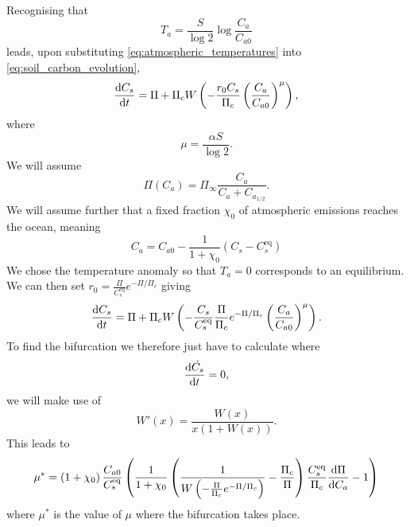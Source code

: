 Recognising that
\begin{equation}
  \label{eq:atmospheric_temperatures}
  T_a = \frac{S}{\log 2} \log \frac{C_a}{C_{a0}} 
\end{equation}
leads, upon substituting \cref{eq:atmospheric_temperatures} into \cref{eq:soil_carbon_evolution},
\begin{equation}
  \label{eq:global_soil_carbon}
  \dv{C_s}{t} = \Pi + \Pi_c W\left(-\frac{r_0C_s}{\Pi_c} \left(\frac{C_a}{C_{a0}}\right)^\mu \right),
\end{equation}
where
\begin{equation}
  \label{eq:mu}
  \mu = \frac{\alpha S}{\log 2}.
\end{equation}
We will assume
\begin{equation}
  \label{eq:npp_fertilization}
  \Pi(C_a) = \Pi_{\infty}\frac{C_a}{C_a + C_{a_{1/2}}}.
\end{equation}
We will assume further that a fixed fraction $\chi_0$ of atmospheric emissions reaches the ocean, meaning
\begin{equation}
  \label{eq:simple_ocean}
  C_a = C_{a0} -\frac{1}{1+\chi_0} (C_s - C_{s}^{\mathrm{eq}})
\end{equation}
We chose the temperature anomaly so that $T_a = 0$ corresponds to an equilibrium. We can then set
$r_0 = \frac{\Pi}{C_s^{\mathrm{eq}}}e^{-\Pi/\Pi_c}$ giving
\begin{equation}
  \label{eq:soil_carbon_evolution_with_r0_fixed}
  \dv{C_s}{t} = \Pi + \Pi_c W\left(-\frac{C_s}{C_s^{\mathrm{eq}}}\frac{\Pi}{\Pi_c}e^{-\Pi/\Pi_c} \left(\frac{C_a}{C_{a0}}\right)^\mu \right).
\end{equation}
To find the bifurcation we therefore just have to calculate where
\begin{equation*}
  \dv{\dot{C_s}}{t} = 0,
\end{equation*}
we will make use of
\begin{equation}
  \label{eq:derivative_of_lambert_W}
  W'(x) = \frac{W(x)}{x\left(1 + W\left(x\right)\right)}.
\end{equation}
This leads to
\begin{equation}
  \label{eq:critical_mu}
  \mu^* = \left(1 + \chi_0\right) \frac{C_{a0}}{C_s^{\mathrm{eq}}} \left( \frac{1}{1+\chi_0}\left( \frac{1}{W\left(-\frac{\Pi}{\Pi_c}e^{-\Pi/\Pi_c}\right)}
      - \frac{\Pi_c}{\Pi}\right)\frac{C_s^{\mathrm{eq}}}{\Pi_c}\dv{\Pi}{C_a} - 1 \right)
\end{equation}
where $\mu^*$ is the value of $\mu$ where the bifurcation takes place.

